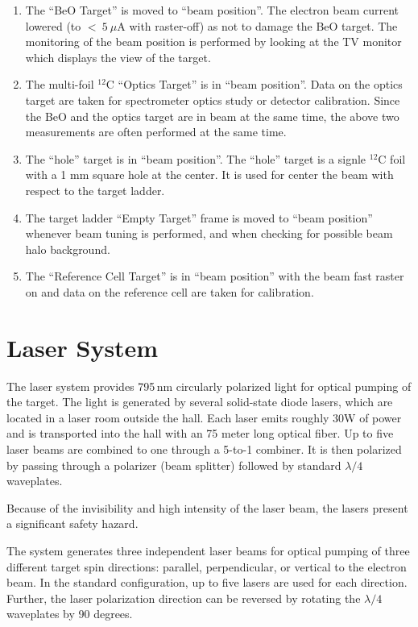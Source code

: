 {\begin{safetyen}{10}{5}
\begin{enumerate}
\item 
The ``BeO Target'' is moved to ``beam position''.
The electron beam current lowered (to $<~5~\mu$A with raster-off) 
as not to damage the 
BeO target.  The monitoring of the beam
position is performed by looking at the TV monitor which displays the
view of the target.

\item 
The multi-foil $^{12}$C ``Optics Target'' is in ``beam position''. Data on the optics
target are taken for spectrometer optics study or detector calibration.
Since the BeO and the optics target are in beam at the same time, the above 
two measurements are often performed at the same time.

\item
The ``hole'' target is in ``beam position''. The ``hole'' target is
a signle $^{12}$C foil with a 1 mm square hole at the center. It is used for
center the beam with respect to the target ladder.  

\item 
The target ladder ``Empty Target''
frame is moved to ``beam position'' whenever
beam tuning is performed, and when checking for possible beam halo
background.

\item  
The ``Reference Cell Target'' is in ``beam position'' with the beam fast
raster on and data on the reference cell are taken for calibration.


\end{enumerate}

\end{safetyen}
\section{Laser System}
\label{sec:lasers}

The laser system provides 795\,nm circularly polarized light for optical
pumping of the target. The light is generated by several solid-state
diode lasers, which are located in a laser room outside the hall.
Each laser emits roughly 30W of
power and is transported into the hall with an 75 meter long optical 
fiber. Up to five laser beams are combined to one through a 5-to-1 combiner.
It is then polarized by passing through a polarizer 
(beam splitter) followed by standard $\lambda/4$ waveplates.  
\begin{safetyen}{10}{5}
  Because of the invisibility and high intensity of the
laser beam, the lasers present a significant safety hazard.
\end{safetyen}
The system generates three independent laser beams for optical
pumping of three different target spin directions: parallel,
perpendicular, or vertical to the electron beam.  In the standard
configuration, up to five lasers are used for each direction.  
Further, the laser polarization direction can be reversed 
by rotating the $\lambda/4$ waveplates by 90 degrees.

}
